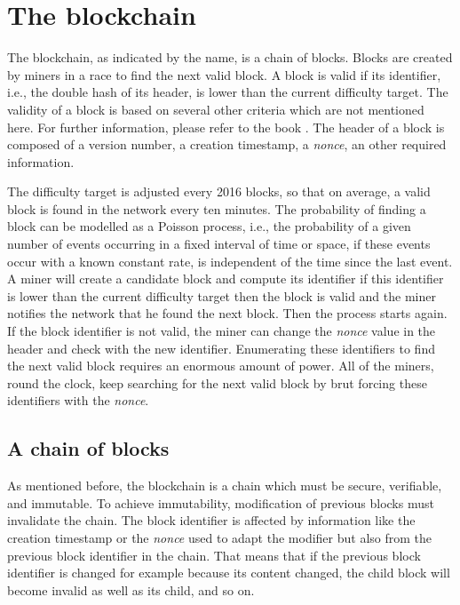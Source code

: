 \newpage

\section{The blockchain}

The blockchain, as indicated by the name, is a chain of blocks. Blocks are
created by miners in a race to find the next valid block. A block is valid if its identifier, i.e., the double hash of its
header, is lower than the current difficulty target. The
validity of a block is based on several other criteria which are not mentioned
here.  For further information, please refer to the book .
The header of a block is composed of a version number, a creation timestamp, a
\textit{nonce}, an other required information.

The difficulty target is adjusted every 2016 blocks, so that on average, a valid
block is found in the network every ten minutes. The probability of finding a block can be modelled as a Poisson process,
i.e., the probability of a given number of events occurring in a fixed interval
of time or space, if these events occur with a known constant rate, is independent
of the time since the last event. A miner will create a candidate block and
compute its identifier if this identifier is lower than the current difficulty
target then the block is valid and the miner notifies the network that he found
the next block. Then the process starts again. If the block identifier is not
valid, the miner can change the \textit{nonce} value in the header and check with the new
identifier. Enumerating these identifiers to find the next valid block requires an
enormous amount of power. All of the miners, round the clock, keep searching for
the next valid block by brut forcing these identifiers with the \textit{nonce}.

\subsection{A chain of blocks}

As mentioned before, the blockchain is a chain which must be secure, verifiable,
and immutable. To achieve immutability, modification of previous blocks must
invalidate the chain. The block identifier is affected by information like the
creation timestamp or the \textit{nonce} used to adapt the modifier but also from the
previous block identifier in the chain. That means that if the previous block
identifier is changed for example because its content changed, the child block
will become invalid as well as its child, and so on.

